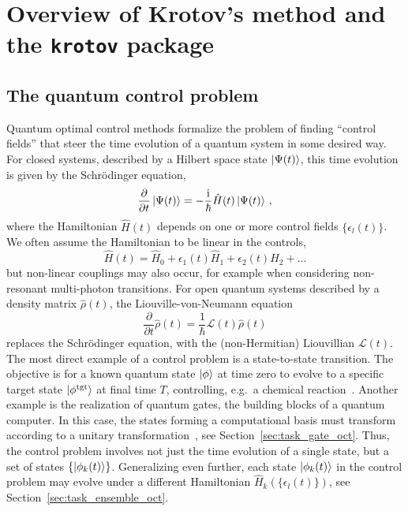 \documentclass[submission, Phys]{SciPost}
\newcommand{\tgt}[0]{\text{tgt}}
\newcommand{\Op}[1]{\hat{#1}}
\newcommand{\Liouville}[0]{\mathcal{L}}
\begin{document}
\section{Overview of Krotov's method and the \texttt{krotov} package}%
\label{sec:overview}


\subsection{The quantum control problem}%
\label{sec:overview_control_problem}

Quantum optimal control methods formalize the problem of finding ``control
fields'' that steer the time evolution of a quantum system in some desired way.
For closed systems, described by a Hilbert space state $\ket{\Psi(t)}$, this
time evolution is given by the Schrödinger equation,
\begin{equation}
  \frac{\partial}{\partial t} \Ket{\Psi(t)}
  = -\frac{\mathrm{i}}{\hbar} \Op{H}(t)\Ket{\Psi(t)}\,,
\end{equation}
where the Hamiltonian $\Op{H}(t)$ depends on one or more control fields
$\{\epsilon_l(t)\}$.
We often assume the Hamiltonian to be linear in the controls,
\begin{equation}
  \Op{H}(t)
  = \Op{H}_0 + \epsilon_1(t) \Op{H}_1 + \epsilon_2(t) \Op{H}_2 + \dots
\end{equation}
but non-linear couplings may also occur, for example when considering
non-resonant multi-photon transitions.
For open quantum systems described by a density matrix $\hat{\rho}(t)$, the
Liouville-von-Neumann equation
\begin{equation}
  \frac{\partial}{\partial t} \hat{\rho}(t) = \frac{1}{\hbar} \Liouville(t) \hat{\rho}(t)
\end{equation}
replaces the Schrödinger equation, with the (non-Hermitian) Liouvillian
$\Liouville(t)$.
The most direct example of a control problem is a state-to-state transition.
The objective is for a known quantum state $\ket{\phi}$ at time zero to evolve
to a specific target state $\ket{\phi^\tgt}$ at final time $T$, controlling,
e.g.\ a chemical reaction~\cite{TannorJCP1985}.
Another example is the realization of quantum gates, the building blocks of a
quantum computer.
In this case, the states forming a computational basis must transform according
to a unitary transformation~\cite{NielsenChuang}, see
Section~\ref{sec:task_gate_oct}.
Thus, the control problem involves not just the time evolution of a single
state, but a set of states $\{\ket{\phi_k(t)}\}$.
Generalizing even further, each state $\ket{\phi_k(t)}$ in the control problem
may evolve under a different Hamiltonian $\Op{H}_k(\{\epsilon_l(t)\})$, see
Section~\ref{sec:task_ensemble_oct}.
\end{document}

